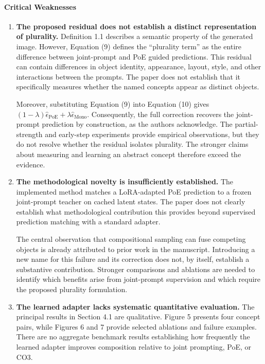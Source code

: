 {\begin{tcolorbox}[breakable,colback=red!3,colframe=red!45!black,title={The review by k4nd, as posted on OpenReview}]
\paragraph{Critical Weaknesses}
\begin{enumerate}
\item \textbf{The proposed residual does not establish a distinct representation of plurality.} Definition 1.1 describes a semantic property of the generated image. However, Equation (9) defines the ``plurality term'' as the entire difference between joint-prompt and PoE guided predictions. This residual can contain differences in object identity, appearance, layout, style, and other interactions between the prompts. The paper does not establish that it specifically measures whether the named concepts appear as distinct objects.
\par Moreover, substituting Equation (9) into Equation (10) gives $(1 - \lambda)\hat\epsilon_{\mathrm{PoE}} + \lambda\hat\epsilon_{\mathrm{Mono}}$. Consequently, the full correction recovers the joint-prompt prediction by construction, as the authors acknowledge. The partial-strength and early-step experiments provide empirical observations, but they do not resolve whether the residual isolates plurality. The stronger claims about measuring and learning an abstract concept therefore exceed the evidence.
\item \textbf{The methodological novelty is insufficiently established.} The implemented method matches a LoRA-adapted PoE prediction to a frozen joint-prompt teacher on cached latent states. The paper does not clearly establish what methodological contribution this provides beyond supervised prediction matching with a standard adapter.
\par The central observation that compositional sampling can fuse competing objects is already attributed to prior work in the manuscript. Introducing a new name for this failure and its correction does not, by itself, establish a substantive contribution. Stronger comparisons and ablations are needed to identify which benefits arise from joint-prompt supervision and which require the proposed plurality formulation.
\item \textbf{The learned adapter lacks systematic quantitative evaluation.} The principal results in Section 4.1 are qualitative. Figure 5 presents four concept pairs, while Figures 6 and 7 provide selected ablations and failure examples. There are no aggregate benchmark results establishing how frequently the learned adapter improves composition relative to joint prompting, PoE, or CO3.

\end{enumerate}
\end{tcolorbox}}
